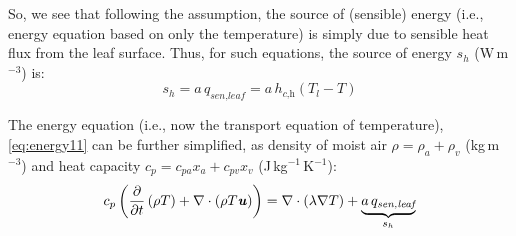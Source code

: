 So, we see that following the assumption, the source of (sensible) energy (i.e., energy equation based on only the temperature) is simply due to sensible heat flux from the leaf surface. Thus, for such equations, the source of energy $s_h$ (W\,m$^{-3}$) is:
\begin{equation}
{s_h} =  a\,q_{\textit{sen,leaf}} = a\, h_{\textit{c,h}} \left(T_l - T\right)
\label{eq:shterm5}
\end{equation}

The energy equation (i.e., now the transport equation of temperature), \cref{eq:energy11} can be further simplified, as density of moist air $\rho = \rho_a + \rho_v$ (kg\,m$^{-3}$) and heat capacity $c_p = c_{\textit{pa}}x_a + c_{\textit{pv}}x_v$ (J\,kg$^{-1}$\,K$^{-1}$):
\begin{equation}
c_p  \left( \frac{\partial }{\partial t} \left( \rho T \right) + \nabla \cdot \left(\rho T \textbf{\textit{u}} \right)  \right) = \nabla  \cdot \left(\lambda \nabla T \right) + \underbrace{a\,q_{\textit{sen,leaf}}}_{s_h}
\label{eq:energy12}
\end{equation}

